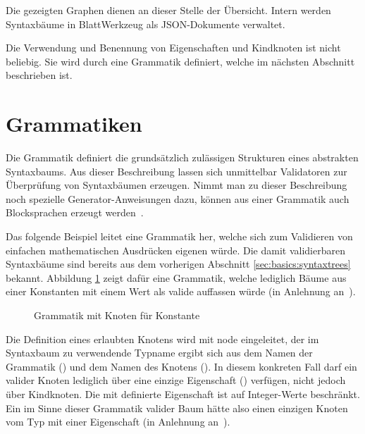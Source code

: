 Die gezeigten Graphen dienen an dieser Stelle der Übersicht. Intern werden Syntaxbäume in BlattWerkzeug als JSON-Dokumente verwaltet.

Die Verwendung und Benennung von Eigenschaften und Kindknoten ist nicht beliebig. Sie wird durch eine Grammatik definiert, welche im nächsten Abschnitt beschrieben ist.

\section{Grammatiken}
\label{sec:basics:grammars}

Die Grammatik definiert die grundsätzlich zulässigen Strukturen eines abstrakten Syntaxbaums. Aus dieser Beschreibung lassen sich unmittelbar Validatoren zur Überprüfung von Syntaxbäumen erzeugen. Nimmt man zu dieser Beschreibung noch spezielle Ge\-ne\-ra\-tor-An\-wei\-sung\-en dazu, können aus einer Grammatik auch Blocksprachen erzeugt werden~\cite[3]{riemer2018}.

Das folgende Beispiel leitet eine Grammatik her, welche sich zum Validieren von einfachen mathematischen Ausdrücken eigenen würde. Die damit validierbaren Syntaxbäume sind bereits aus dem vorherigen Abschnitt \ref{sec:basics:syntaxtrees} bekannt. Abbildung \ref{fig:basics:grammars:1} zeigt dafür eine Grammatik, welche lediglich Bäume aus einer Konstanten mit einem Wert als valide auffassen würde (in Anlehnung an~\cite[6]{riemer2018}).

\begin{figure}[h]
  
  \caption{Grammatik mit Knoten für Konstante}
  \label{fig:basics:grammars:1}
\end{figure}

Die Definition eines erlaubten Knotens wird mit node eingeleitet, der im Syntaxbaum zu verwendende Typname ergibt sich aus dem Namen der Grammatik () und dem Namen des Knotens (). In diesem konkreten Fall darf ein valider Knoten lediglich über eine einzige Eigenschaft ()  verfügen, nicht jedoch über Kindknoten. Die mit  definierte Eigenschaft ist auf Integer-Werte beschränkt. Ein im Sinne dieser Grammatik valider Baum hätte also einen einzigen Knoten vom Typ  mit einer Eigenschaft  (in Anlehnung an~\cite[6]{riemer2018}).

